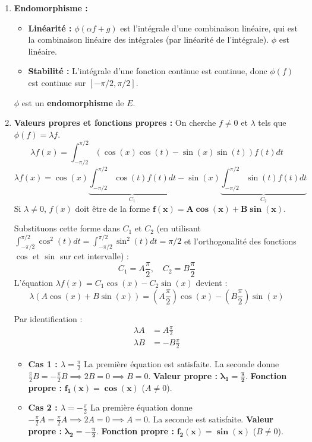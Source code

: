 \documentclass[french]{yLectureNote}
\begin{document}
\begin{enumerate}
    \item \textbf{Endomorphisme :}
    \begin{itemize}
        \item \textbf{Linéarité :} $\phi(\alpha f + g)$ est l'intégrale d'une combinaison linéaire, qui est la combinaison linéaire des intégrales (par linéarité de l'intégrale). $\phi$ est linéaire.
        \item \textbf{Stabilité :} L'intégrale d'une fonction continue est continue, donc $\phi(f)$ est continue sur $[-\pi/2, \pi/2]$.
    \end{itemize}
    $\phi$ est un \textbf{endomorphisme} de $E$.

    \item \textbf{Valeurs propres et fonctions propres :}
    On cherche $f \ne 0$ et $\lambda$ tels que $\phi(f) = \lambda f$.
    $$\lambda f(x) = \int_{-\pi/2}^{\pi/2} (\cos(x)\cos(t) - \sin(x)\sin(t)) f(t) dt$$
    $$\lambda f(x) = \cos(x) \underbrace{\int_{-\pi/2}^{\pi/2} \cos(t) f(t) dt}_{C_1} - \sin(x) \underbrace{\int_{-\pi/2}^{\pi/2} \sin(t) f(t) dt}_{C_2}$$
    Si $\lambda \ne 0$, $f(x)$ doit être de la forme $\mathbf{f(x) = A \cos(x) + B \sin(x)}$.

    Substituons cette forme dans $C_1$ et $C_2$ (en utilisant $\int_{-\pi/2}^{\pi/2} \cos^2(t) dt = \int_{-\pi/2}^{\pi/2} \sin^2(t) dt = \pi/2$ et l'orthogonalité des fonctions $\cos$ et $\sin$ sur cet intervalle) :
    $$C_1 = A \frac{\pi}{2}, \quad C_2 = B \frac{\pi}{2}$$
    L'équation $\lambda f(x) = C_1 \cos(x) - C_2 \sin(x)$ devient :
    $$\lambda (A \cos(x) + B \sin(x)) = \left(A \frac{\pi}{2}\right) \cos(x) - \left(B \frac{\pi}{2}\right) \sin(x)$$

    Par identification :
    \begin{align*} \lambda A &= A \frac{\pi}{2} \\ \lambda B &= -B \frac{\pi}{2} \end{align*}

    \begin{itemize}
        \item \textbf{Cas 1 : $\lambda = \frac{\pi}{2}$}
        La première équation est satisfaite. La seconde donne $\frac{\pi}{2} B = -\frac{\pi}{2} B \implies 2 B = 0 \implies B=0$.
        \textbf{Valeur propre :} $\mathbf{\lambda_1 = \frac{\pi}{2}}$.
        \textbf{Fonction propre :} $\mathbf{f_1(x) = \cos(x)}$ ($A \ne 0$).

        \item \textbf{Cas 2 : $\lambda = -\frac{\pi}{2}$}
        La première équation donne $-\frac{\pi}{2} A = \frac{\pi}{2} A \implies 2 A = 0 \implies A=0$. La seconde est satisfaite.
        \textbf{Valeur propre :} $\mathbf{\lambda_2 = -\frac{\pi}{2}}$.
        \textbf{Fonction propre :} $\mathbf{f_2(x) = \sin(x)}$ ($B \ne 0$).


\end{itemize}
\end{enumerate}
\end{document}
